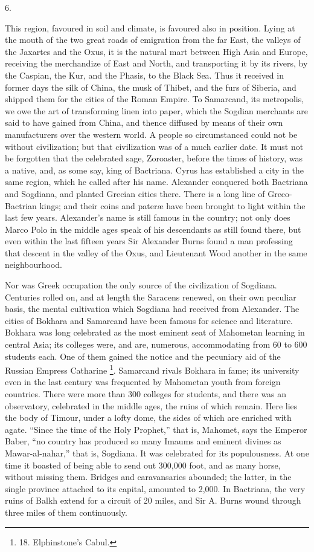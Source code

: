 6.

This region, favoured in soil
and climate, is favoured also in position. Lying at the mouth of the
two great roads of emigration from the far East, the valleys of the
Jaxartes and the Oxus, it is the natural mart between High Asia and
Europe, receiving the merchandize of East and North, and transporting
it by its rivers, by the Caspian, the Kur, and the Phasis, to the
Black Sea. Thus it received in former days the silk of China, the musk
of Thibet, and the furs of Siberia, and shipped them for the cities of
the Roman Empire. To Samarcand, its metropolis, we owe the art of
transforming linen into paper, which the Sogdian merchants are said to
have gained from China, and thence diffused by means of their own
manufacturers over the western world. A people so circumstanced
could not be without civilization; but that civilization was of a much
earlier date. It must not be forgotten that the celebrated sage,
Zoroaster, before the times of history, was a native, and, as some
say, king of Bactriana. Cyrus has established a city in the same
region, which he called after his name. Alexander conquered both
Bactriana and Sogdiana, and planted Grecian cities there. There is a
long line of Greco-Bactrian kings; and their coins and pateræ have
been brought to light within the last few years. Alexander's name is
still famous in the country; not only does Marco Polo in the middle
ages speak of his descendants as still found there, but even within
the last fifteen years Sir Alexander Burns found a man professing that
descent in the valley of the Oxus, and Lieutenant Wood another in the
same neighbourhood.

Nor was Greek occupation the
only source of the civilization of Sogdiana. Centuries rolled on, and
at length the Saracens renewed, on their own peculiar basis, the
mental cultivation which Sogdiana had received from Alexander. The
cities of Bokhara and Samarcand have been famous for science and
literature. Bokhara was long celebrated as the most eminent seat of
Mahometan learning in central Asia; its colleges were, and are,
numerous, accommodating from 60 to 600 students each. One of them
gained the notice and the pecuniary aid of the Russian Empress
Catharine \footnote{18.
Elphinstone's Cabul.}. Samarcand
rivals Bokhara in fame; its university even in the last century was
frequented by Mahometan youth from foreign countries. There were more
than 300 colleges for students, and there was an observatory,
celebrated in the middle ages, the ruins of which remain. Here lies
the body of Timour, under a lofty dome, the sides of which are
enriched with agate. ``Since the time of the Holy Prophet,'' that is,
Mahomet, says the Emperor Baber, ``no country has produced so many
Imaums and eminent divines as Mawar-al-nahar,'' that is, Sogdiana. It
was celebrated for its populousness. At one time it boasted of being
able to send out 300,000 foot, and as many horse, without missing
them. Bridges and caravansaries abounded; the latter, in the single
province attached to its capital, amounted to 2,000. In Bactriana, the
very ruins of Balkh extend for a circuit of 20 miles, and Sir A. Burns
wound through three miles of them continuously.

